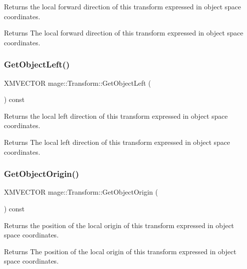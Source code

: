 Returns the local forward direction of this transform expressed in object space coordinates.

\begin{DoxyReturn}{Returns}
The local forward direction of this transform expressed in object space coordinates. 
\end{DoxyReturn}
\hypertarget{structmage_1_1_transform_a12946ff32c7044889f7c89c9182dba76}{}\label{structmage_1_1_transform_a12946ff32c7044889f7c89c9182dba76} 
\subsubsection{\texorpdfstring{Get\+Object\+Left()}{GetObjectLeft()}}
{\footnotesize\ttfamily X\+M\+V\+E\+C\+T\+OR mage\+::\+Transform\+::\+Get\+Object\+Left (\begin{DoxyParamCaption}{ }\end{DoxyParamCaption}) const}

Returns the local left direction of this transform expressed in object space coordinates.

\begin{DoxyReturn}{Returns}
The local left direction of this transform expressed in object space coordinates. 
\end{DoxyReturn}
\hypertarget{structmage_1_1_transform_a2f7cfedf5c67115cb6c29aac07c71d07}{}\label{structmage_1_1_transform_a2f7cfedf5c67115cb6c29aac07c71d07} 
\subsubsection{\texorpdfstring{Get\+Object\+Origin()}{GetObjectOrigin()}}
{\footnotesize\ttfamily X\+M\+V\+E\+C\+T\+OR mage\+::\+Transform\+::\+Get\+Object\+Origin (\begin{DoxyParamCaption}{ }\end{DoxyParamCaption}) const}

Returns the position of the local origin of this transform expressed in object space coordinates.

\begin{DoxyReturn}{Returns}
The position of the local origin of this transform expressed in object space coordinates. 
\end{DoxyReturn}
\hypertarget{structmage_1_1_transform_a8da2bed8599b4f012ac85af9d76c7f37}{}\label{structmage_1_1_transform_a8da2bed8599b4f012ac85af9d76c7f37} 
